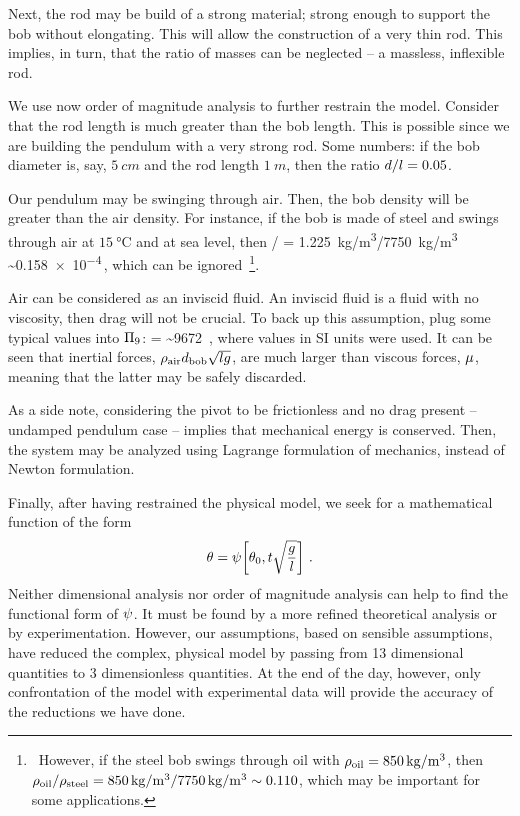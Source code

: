 Next, the rod may be build of a strong material; strong enough to support the bob without elongating. This will allow the construction of a very thin rod. This implies, in turn, that the ratio of masses can be neglected -- a massless, inflexible rod.

We use now order of magnitude analysis to further restrain the model. Consider that the rod length is much greater than the bob length. This is possible since we are building the pendulum with a very strong rod. Some numbers: if the bob diameter is, say, $\SI{5}{cm}$ and the rod length $\SI{1}{m}$, then the ratio $d/l = 0.05$.

Our pendulum may be swinging through air. Then, the bob density will be greater than the air density. For instance, if the bob is made of steel and swings through air at $\SI{15}{\celsius}$ and at sea level, then 
\beq
\dens{}/\dens{} = \SI{1.225}{kg/m^3}/\SI{7750}{kg/m^3} \sim \num{0.158e-4}\,, 
\eeq
which can be ignored~\footnote{~However, if the steel bob swings through oil with $\rho_\text{oil} = \SI{850}{kg/m^3}$, then $\rho_\text{oil}/\rho_\text{steel} = \SI{850}{kg/m^3}/\SI{7750}{kg/m^3} \sim \num{0.110}$, which may be important for some applications.}.

Air can be considered as an inviscid fluid. An inviscid fluid is a fluid with no viscosity, then drag will not be crucial. To back up this assumption, plug some typical values into $\Pi_9$:
\beq
{}
= 
\sim \num{9672} \,,
\eeq
where values in SI units were used. It can be seen that inertial forces, $\rho_\text{air}d_\text{bob}\sqrt{lg}$, are much larger than viscous forces, $\mu$, meaning that the latter may be safely discarded.

As a side note, considering the pivot to be frictionless and no drag present -- undamped pendulum case -- implies that mechanical energy is conserved. Then, the system may be analyzed using Lagrange formulation of mechanics, instead of Newton formulation.

Finally, after having restrained the physical model, we seek for a mathematical function of the form
\begin{equation}\label{eq:simplegravpendulumdimanalysis}
\theta = \psi\!\left[{
            \theta_0, 
            t\sqrt{\dfrac{g}{l}}
            }\right]\,.
\end{equation}
Neither dimensional analysis nor order of magnitude analysis can help to find the functional form of $\psi$. It must be found by a more refined theoretical analysis or by experimentation. However, our assumptions, based on sensible assumptions, have reduced the complex, physical model by passing from 13 dimensional quantities to 3 dimensionless quantities. At the end of the day, however, only confrontation of the model with experimental data will provide the accuracy of the reductions we have done.

